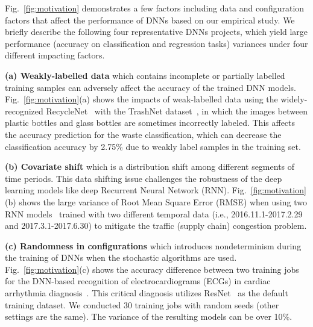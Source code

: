 Fig.~\ref{fig:motivation} demonstrates a few factors including data and configuration factors that affect the performance of DNNs based on our empirical study.
We briefly describe the following four representative DNNs projects, which yield large performance (accuracy on classification  and regression tasks) variances under four different impacting factors.

\bi
\item {\textbf{(a) Weakly-labelled data}} which contains incomplete or partially labelled training samples can adversely affect the accuracy of the trained DNN models. 
Fig.~\ref{fig:motivation}(a) shows the impacts of weak-labelled data using the widely-recognized RecycleNet~\cite{bircanouglu2018recyclenet} with the TrashNet dataset~\cite {DataTrashNet}, in which the images between plastic bottles and glass bottles are sometimes incorrectly labeled. This  affects the accuracy prediction for the waste classification, which can decrease the classification accuracy by 2.75\% due to weakly label samples in the training set.

\item {\textbf{(b) Covariate shift}} which is a distribution  shift among different segments of time periods. This data shifting issue challenges the robustness of the deep learning models like deep Recurrent Neural Network (RNN). 
Fig.~\ref{fig:motivation}(b) shows the large variance of Root Mean Square Error (RMSE) when using two RNN models~\cite{KaggleTraffic} trained with two different temporal data (i.e., 2016.11.1-2017.2.29 and 2017.3.1-2017.6.30) to mitigate the traffic (supply chain) congestion problem. 

\item {\textbf{(c) Randomness in configurations}} which introduces nondeterminism during the training of DNNs when the stochastic algorithms are used.
Fig.~\ref{fig:motivation}(c) shows the accuracy difference between two training jobs for the DNN-based recognition of  electrocardiograms (ECGs) in cardiac arrhythmia diagnosis~\cite{hannun2019cardiologistlevel,wang2020deep}.  
This critical diagnosis utilizes ResNet~\cite{hannun2019cardiologistlevel} as the default training dataset. We conducted 30 training jobs with random seeds (other settings are the same). The variance of the resulting models can be over 10\%.

